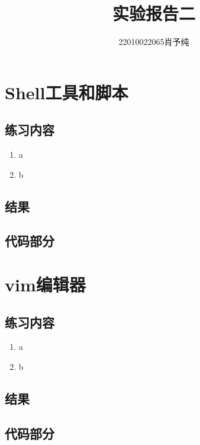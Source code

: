 \documentclass{article}
\begin{document}
	\title{实验报告二}
	\author{22010022065肖予纯}
	\maketitle
	\section{Shell工具和脚本}
	\subsection{练习内容}
	\begin{enumerate}
		\item a
		\item b
	\end{enumerate}
	

	\subsection{结果}
	\begin{figure}[h]
		\centering
		
	\end{figure}
	\subsection{代码部分}

	
	
	
	
	\section{vim编辑器}
	\subsection{练习内容}
	\begin{enumerate}
		\item a
		\item b
	\end{enumerate}
	\subsection{结果}
	\begin{figure}[h]
		\centering

	\end{figure}
	\subsection{代码部分}
	\begin{figure}[h]
		\centering

	\end{figure}
	
\end{document}
